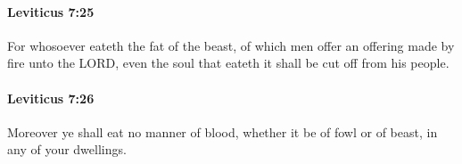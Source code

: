 		\paragraph{Leviticus 7:25} %
			\label{LEVITICUS-7-25}

			For whosoever eateth the fat of the beast, of which men offer an offering made by fire unto the LORD, even the soul that eateth it shall be cut off from his people.


		\paragraph{Leviticus 7:26} %
			\label{LEVITICUS-7-26}

			Moreover ye shall eat no manner of blood, whether it be of fowl or of beast, in any of your dwellings.


